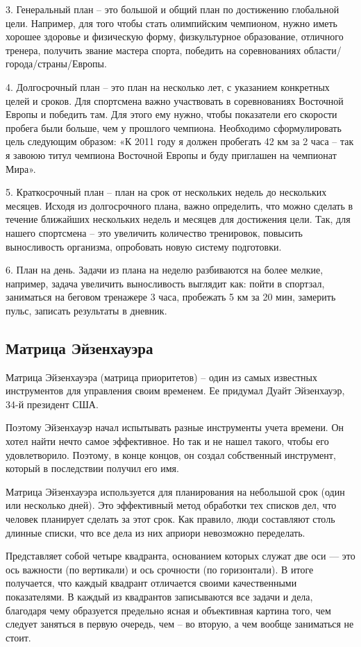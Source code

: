 3. Генеральный план – это большой и общий план по достижению глобальной цели. Например, для того чтобы стать олимпийским чемпионом, нужно иметь хорошее здоровье и физическую форму, физкультурное образование, отличного тренера, получить звание мастера спорта, победить на соревнованиях области/города/страны/Европы. 

4. Долгосрочный план – это план на несколько лет, с указанием конкретных целей и сроков. Для спортсмена важно участвовать в соревнованиях Восточной Европы и победить там. Для этого ему нужно, чтобы показатели его скорости пробега были больше, чем у прошлого чемпиона. Необходимо сформулировать цель следующим образом: «К 2011 году я должен пробегать 42 км за 2 часа – так я завоюю титул чемпиона Восточной Европы и буду приглашен на чемпионат Мира». 

5. Краткосрочный план – план на срок от нескольких недель до нескольких месяцев. Исходя из долгосрочного плана, важно определить, что можно сделать в течение ближайших нескольких недель и месяцев для достижения цели. Так, для нашего спортсмена – это увеличить количество тренировок, повысить выносливость организма, опробовать новую систему подготовки. 

6. План на день. Задачи из плана на неделю разбиваются на более мелкие, например, задача увеличить выносливость выглядит как: пойти в спортзал, заниматься на беговом тренажере 3 часа, пробежать 5 км за 20 мин, замерить пульс, записать результаты в дневник.

\subsection{Матрица Эйзенхауэра}
Матрица Эйзенхауэра (матрица приоритетов) – один из самых известных инструментов для управления своим временем. Ее придумал Дуайт Эйзенхауэр, 34-й президент США.

Поэтому Эйзенхауэр начал испытывать разные инструменты учета времени. Он хотел  найти нечто самое эффективное. Но так и не нашел такого, чтобы его удовлетворило. Поэтому, в конце концов, он создал собственный инструмент, который в последствии получил его имя.

Матрица Эйзенхауэра используется для планирования на небольшой срок (один или несколько дней). Это эффективный метод обработки тех списков дел, что человек планирует сделать за этот срок. Как правило, люди составляют столь длинные списки, что все дела из них априори невозможно переделать.

Представляет собой четыре квадранта, основанием которых служат две оси — это ось важности (по вертикали) и ось срочности (по горизонтали). В итоге получается, что каждый квадрант отличается своими качественными показателями. В каждый из квадрантов записываются все задачи и дела, благодаря чему образуется предельно ясная и объективная картина того, чем следует заняться в первую очередь, чем – во вторую, а чем вообще заниматься не стоит.

